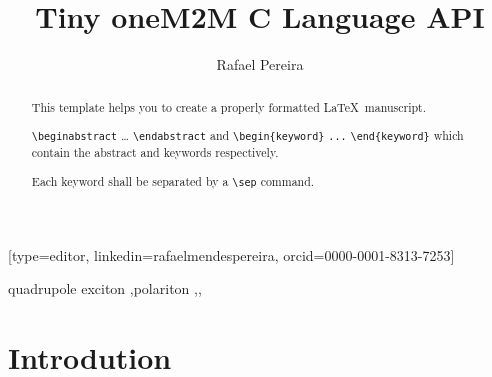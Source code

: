 \documentclass[a4paper,fleqn]{cas-dc}
\begin{document}
\let\WriteBookmarks\relax
\def\floatpagepagefraction{1}
\def\textpagefraction{.001}

\title [mode = title]{Tiny oneM2M C Language API}                     


\author[1]{Rafael Pereira}[type=editor,
                        linkedin=rafaelmendespereira,
                        orcid=0000-0001-8313-7253]

\address[1]{Computer Science and Communications Research Centre, School of Technology and Management, Polytechnic of Leiria, 2411-901 Leiria, Portugal}

\begin{abstract}
This template helps you to create a properly formatted \LaTeX\ manuscript.

\noindent\texttt{\textbackslash begin{abstract}} \dots 
\texttt{\textbackslash end{abstract}} and
\verb+\begin{keyword}+ \verb+...+ \verb+\end{keyword}+ 
which
contain the abstract and keywords respectively. 

\noindent Each keyword shall be separated by a \verb+\sep+ command.
\end{abstract}

%

\begin{keywords}
quadrupole exciton \sep polariton \sep \WGM \sep \BEC
\end{keywords}


\maketitle

\section{Introdution}
\end{document}
